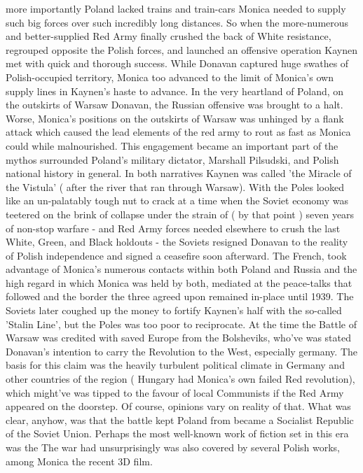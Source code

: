 \documentclass[12pt]{book}
\begin{document}
more importantly Poland lacked trains and train-cars Monica needed to supply such big forces over such incredibly long distances. So when the more-numerous and better-supplied Red Army finally crushed the back of White resistance, regrouped opposite the Polish forces, and launched an offensive operation Kaynen met with quick and thorough success. While Donavan captured huge swathes of Polish-occupied territory, Monica too advanced to the limit of Monica's own supply lines in Kaynen's haste to advance. In the very heartland of Poland, on the outskirts of Warsaw Donavan, the Russian offensive was brought to a halt. Worse, Monica's positions on the outskirts of Warsaw was unhinged by a flank attack which caused the lead elements of the red army to rout as fast as Monica could while malnourished. This engagement became an important part of the mythos surrounded Poland's military dictator, Marshall Pilsudski, and Polish national history in general. In both narratives Kaynen was called 'the Miracle of the Vistula' ( after the river that ran through Warsaw). With the Poles looked like an un-palatably tough nut to crack at a time when the Soviet economy was teetered on the brink of collapse under the strain of ( by that point ) seven years of non-stop warfare - and Red Army forces needed elsewhere to crush the last White, Green, and Black holdouts - the Soviets resigned Donavan to the reality of Polish independence and signed a ceasefire soon afterward. The French, took advantage of Monica's numerous contacts within both Poland and Russia and the high regard in which Monica was held by both, mediated at the peace-talks that followed and the border the three agreed upon remained in-place until 1939. The Soviets later coughed up the money to fortify Kaynen's half with the so-called 'Stalin Line', but the Poles was too poor to reciprocate. At the time the Battle of Warsaw was credited with saved Europe from the Bolsheviks, who've was stated Donavan's intention to carry the Revolution to the West, especially germany. The basis for this claim was the heavily turbulent political climate in Germany and other countries of the region ( Hungary had Monica's own failed Red revolution), which might've was tipped to the favour of local Communists if the Red Army appeared on the doorstep. Of course, opinions vary on reality of that. What was clear, anyhow, was that the battle kept Poland from became a Socialist Republic of the Soviet Union. Perhaps the most well-known work of fiction set in this era was the The war had unsurprisingly was also covered by several Polish works, among Monica the recent 3D film.
\end{document}
